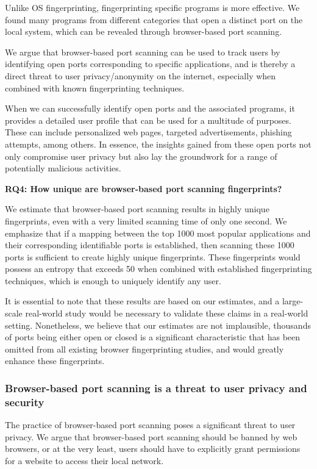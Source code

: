 Unlike OS fingerprinting, fingerprinting specific programs is more effective. We found many programs from different categories that open a distinct port on the local system, which can be revealed through browser-based port scanning. 

We argue that browser-based port scanning can be used to track users by identifying open ports corresponding to specific applications, and is thereby a direct threat to user privacy/anonymity on the internet, especially when combined with known fingerprinting techniques.

When we can successfully identify open ports and the associated programs, it provides a detailed user profile that can be used for a multitude of purposes. These can include personalized web pages, targeted advertisements, phishing attempts, among others. In essence, the insights gained from these open ports not only compromise user privacy but also lay the groundwork for a range of potentially malicious activities.

\textbf{RQ4: How unique are browser-based port scanning fingerprints?}

We estimate that browser-based port scanning results in highly unique fingerprints, even with a very limited scanning time of only one second. We emphasize that if a mapping between the top 1000 most popular applications and their corresponding identifiable ports is established, then scanning these 1000 ports is sufficient to create highly unique fingerprints. These fingerprints would possess an entropy that exceeds 50 when combined with established fingerprinting techniques, which is enough to uniquely identify any user.

It is essential to note that these results are based on our estimates, and a large-scale real-world study would be necessary to validate these claims in a real-world setting. Nonetheless, we believe that our estimates are not implausible, thousands of ports being either open or closed is a significant characteristic that has been omitted from all existing browser fingerprinting studies, and would greatly enhance these fingerprints.


\subsubsection{Browser-based port scanning is a threat to user privacy and security}

The practice of browser-based port scanning poses a significant threat to user privacy. We argue that browser-based port scanning should be banned by web browsers, or at the very least, users should have to explicitly grant permissions for a website to access their local network. 

